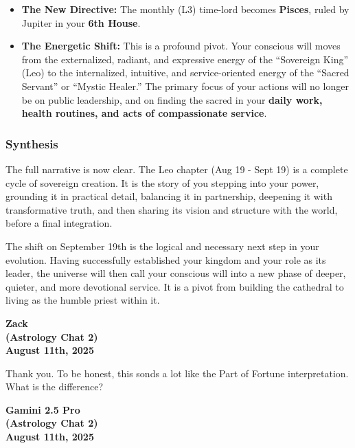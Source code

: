 \documentclass{article}
\begin{document}
\begin{itemize}
\item
  \textbf{The New Directive:} The monthly (L3) time-lord becomes \textbf{Pisces}, ruled by Jupiter in your \textbf{6th House}.
\item
  \textbf{The Energetic Shift:} This is a profound pivot. Your conscious will moves from the externalized, radiant, and expressive energy of the ``Sovereign King'' (Leo) to the internalized, intuitive, and service-oriented energy of the ``Sacred Servant'' or ``Mystic Healer.'' The primary focus of your actions will no longer be on public leadership, and on finding the sacred in your \textbf{daily work, health routines, and acts of compassionate service}.
\end{itemize}

\subsubsection*{Synthesis}\label{synthesis}

The full narrative is now clear. The Leo chapter (Aug 19 - Sept 19) is a complete cycle of sovereign creation. It is the story of you stepping into your power, grounding it in practical detail, balancing it in partnership, deepening it with transformative truth, and then sharing its vision and structure with the world, before a final integration.

The shift on September 19th is the logical and necessary next step in your evolution. Having successfully established your kingdom and your role as its leader, the universe will then call your conscious will into a new phase of deeper, quieter, and more devotional service. It is a pivot from building the cathedral to living as the humble priest within it.


\begin{center}
\textbf{Zack} \\
\textbf{(Astrology Chat 2)} \\
\textbf{August 11th, 2025} 
\end{center}

Thank you. To be honest, this sonds a lot like the Part of Fortune interpretation. What is the difference?

\begin{center}
\textbf{Gamini 2.5 Pro} \\
\textbf{(Astrology Chat 2)} \\
\textbf{August 11th, 2025}
\end{center}
\end{document}
